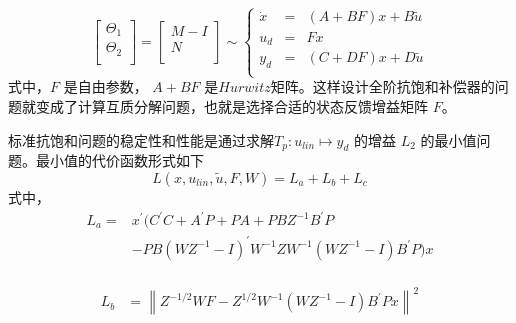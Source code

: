 \begin{equation}
\label{eq:chap6:awks}
\begin{bmatrix}
\Theta_1  \\
\Theta_2  \\
\end{bmatrix}
=\begin{bmatrix}
M-I	  \\
N     \\
\end{bmatrix}
\sim
\left\{\begin{matrix}
 \dot x &=& (A+BF)x+B \tilde{u }  \\
 u_d &=& F x    \\
 y_d &=& (C+DF)x +D \tilde{u}     \\
\end{matrix}\right.
\end{equation}
式中，$F$ 是自由参数， $A+BF$ 是$Hurwitz$矩阵。这样设计全阶抗饱和补偿器的问题就变成了计算互质分解问题，也就是选择合适的状态反馈增益矩阵 $F$。

标准抗饱和问题的稳定性和性能是通过求解$T_p: u_{lin} \mapsto y_d$ 的增益 $L_2$ 的最小值问题。最小值的代价函数形式如下
\begin{equation}
\label{eq:chap6:costfunction}
L(x,u_{lin},\tilde{u},F,W) = L_a + L_b + L_c
\end{equation}
式中，
\begin{equation}
\begin{aligned}
\label{eq:chap6:La}
L_a =& x^{'} (C^{'}C + A^{'}P + PA + PBZ^{-1} B^{'} P \\
&- PB(WZ^{-1} - I)^{'} W^{-1} Z W^{-1} (W Z^{-1} - I)B^{'}P)x \\
\end{aligned}
\end{equation}

\begin{equation}
\begin{aligned}
\label{eq:chap6:Lb}
L_b &= \left \| Z^{-1/2}WF - Z^{1/2}W^{-1}(WZ^{-1}-I)B^{'}Px \right \| ^{2}
\\
\end{aligned}
\end{equation}

